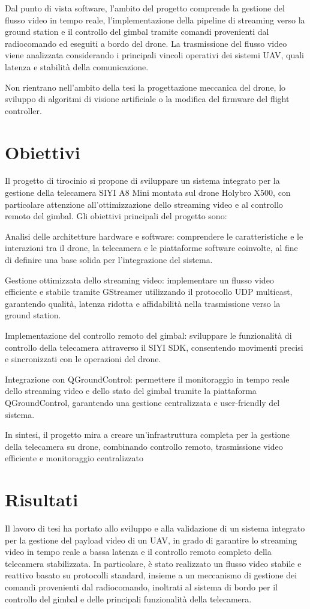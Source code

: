 Dal punto di vista software, l’ambito del progetto comprende la gestione del flusso video in tempo reale, l’implementazione della pipeline di streaming verso la ground station e il controllo del gimbal tramite comandi provenienti dal radiocomando ed eseguiti a bordo del drone. La trasmissione del flusso video viene analizzata considerando i principali vincoli operativi dei sistemi UAV, quali latenza e stabilità della comunicazione.\bigskip

Non rientrano nell’ambito della tesi la progettazione meccanica del drone, lo sviluppo di algoritmi di visione artificiale o la modifica del firmware del flight controller.
\section{Obiettivi}
Il progetto di tirocinio si propone di sviluppare un sistema integrato per la gestione della telecamera SIYI A8 Mini montata sul drone Holybro X500, con particolare attenzione all’ottimizzazione dello streaming video e al controllo remoto del gimbal. Gli obiettivi principali del progetto sono:

Analisi delle architetture hardware e software: comprendere le caratteristiche e le interazioni tra il drone, la telecamera e le piattaforme software coinvolte, al fine di definire una base solida per l’integrazione del sistema.

Gestione ottimizzata dello streaming video: implementare un flusso video efficiente e stabile tramite GStreamer utilizzando il protocollo UDP multicast, garantendo qualità, latenza ridotta e affidabilità nella trasmissione verso la ground station.

Implementazione del controllo remoto del gimbal: sviluppare le funzionalità di controllo della telecamera attraverso il SIYI SDK, consentendo movimenti precisi e sincronizzati con le operazioni del drone.

Integrazione con QGroundControl: permettere il monitoraggio in tempo reale dello streaming video e dello stato del gimbal tramite la piattaforma QGroundControl, garantendo una gestione centralizzata e user-friendly del sistema.

In sintesi, il progetto mira a creare un’infrastruttura completa per la gestione della telecamera su drone, combinando controllo remoto, trasmissione video efficiente e monitoraggio centralizzato

\section{Risultati}
Il lavoro di tesi ha portato allo sviluppo e alla validazione di un sistema integrato per la gestione del payload video di un UAV, in grado di garantire lo streaming video in tempo reale a bassa latenza e il controllo remoto completo della telecamera stabilizzata. In particolare, è stato realizzato un flusso video stabile e reattivo basato su protocolli standard, insieme a un meccanismo di gestione dei comandi provenienti dal radiocomando, inoltrati al sistema di bordo per il controllo del gimbal e delle principali funzionalità della telecamera.

